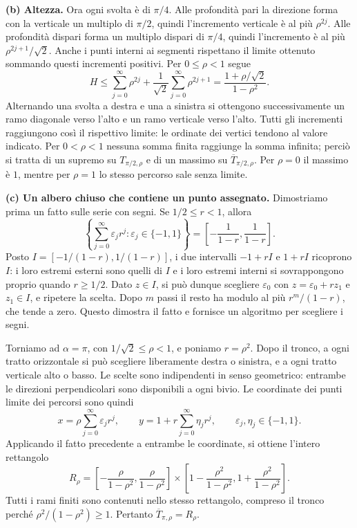 {\textbf{(b) Altezza.}
Ora ogni svolta \`e di $\pi/4$. Alle profondit\`a pari la direzione
forma con la verticale un multiplo di $\pi/2$, quindi l'incremento
verticale \`e al pi\`u $\rho^{2j}$. Alle profondit\`a dispari forma
un multiplo dispari di $\pi/4$, quindi l'incremento \`e al pi\`u
$\rho^{2j+1}/\sqrt2$. Anche i punti interni ai segmenti rispettano
il limite ottenuto sommando questi incrementi positivi.
Per $0\le\rho<1$ segue
\[
 H\le\sum_{j=0}^{\infty}\rho^{2j}
      +\frac1{\sqrt2}\sum_{j=0}^{\infty}\rho^{2j+1}
   =\frac{1+\rho/\sqrt2}{1-\rho^2}.
\]
Alternando una svolta a destra e una a sinistra si ottengono
successivamente un ramo diagonale verso l'alto e un ramo verticale
verso l'alto. Tutti gli incrementi raggiungono cos\`i il rispettivo
limite: le ordinate dei vertici tendono al valore indicato.
Per $0<\rho<1$ nessuna somma finita raggiunge la somma infinita;
perci\`o si tratta di un supremo su $T_{\pi/2,\rho}$ e di un massimo
su $\overline T_{\pi/2,\rho}$. Per $\rho=0$ il massimo \`e $1$,
mentre per $\rho=1$ lo stesso percorso sale senza limite.

\textbf{(c) Un albero chiuso che contiene un punto assegnato.}
Dimostriamo prima un fatto sulle serie con segni. Se $1/2\le r<1$, allora
\[
 \left\{\sum_{j=0}^{\infty}\varepsilon_j r^j:
              \varepsilon_j\in\{-1,1\}\right\}
 =\left[-\frac1{1-r},\frac1{1-r}\right].
\]
Posto $I=[-1/(1-r),1/(1-r)]$, i due intervalli $-1+rI$ e $1+rI$
ricoprono $I$: i loro estremi esterni sono quelli di $I$ e i loro
estremi interni si sovrappongono proprio quando $r\ge1/2$.
Dato $z\in I$, si pu\`o dunque scegliere $\varepsilon_0$ con
$z=\varepsilon_0+rz_1$ e $z_1\in I$, e ripetere la scelta.
Dopo $m$ passi il resto ha modulo al pi\`u $r^m/(1-r)$, che tende a zero.
Questo dimostra il fatto e fornisce un algoritmo per scegliere i segni.

Torniamo ad $\alpha=\pi$, con $1/\sqrt2\le\rho<1$, e poniamo $r=\rho^2$.
Dopo il tronco, a ogni tratto orizzontale si pu\`o scegliere liberamente
destra o sinistra, e a ogni tratto verticale alto o basso. Le scelte
sono indipendenti in senso geometrico: entrambe le direzioni
perpendicolari sono disponibili a ogni bivio. Le coordinate dei punti
limite dei percorsi sono quindi
\[
 x=\rho\sum_{j=0}^{\infty}\varepsilon_j r^j,
 \qquad
 y=1+r\sum_{j=0}^{\infty}\eta_j r^j,
 \qquad \varepsilon_j,\eta_j\in\{-1,1\}.
\]
Applicando il fatto precedente a entrambe le coordinate, si ottiene
l'intero rettangolo
\[
 R_\rho=
 \left[-\frac{\rho}{1-\rho^2},\frac{\rho}{1-\rho^2}\right]
 \times
 \left[1-\frac{\rho^2}{1-\rho^2},1+\frac{\rho^2}{1-\rho^2}\right].
\]
Tutti i rami finiti sono contenuti nello stesso rettangolo, compreso
il tronco perch\'e $\rho^2/(1-\rho^2)\ge1$.
Pertanto $\overline T_{\pi,\rho}=R_\rho$.

}
